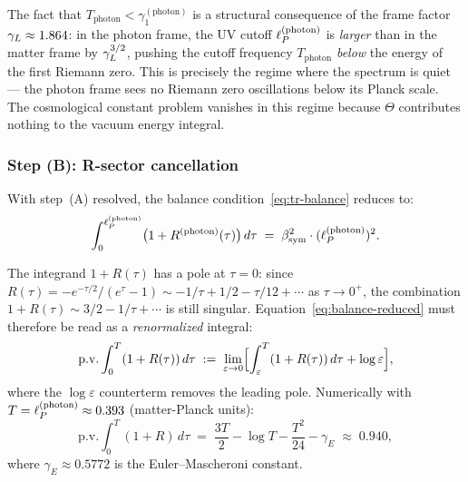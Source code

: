\begin{remark}
\label{rem:photon-frame-below-first-zero}
The fact that $T_{\mathrm{photon}} < \gamma_1^{(\mathrm{photon})}$
is a structural consequence of the frame factor $\gamma_L \approx 1.864$:
in the photon frame, the UV cutoff $\ell_P^{(\mathrm{photon})}$ is
\emph{larger} than in the matter frame by $\gamma_L^{3/2}$, pushing the
cutoff frequency $T_{\mathrm{photon}}$ \emph{below} the energy of
the first Riemann zero. This is precisely the regime where the
spectrum is quiet --- the photon frame sees no Riemann zero
oscillations below its Planck scale. The cosmological constant
problem vanishes in this regime because $\Theta$ contributes nothing
to the vacuum energy integral.
\end{remark}

\subsubsection*{Step (B): R-sector cancellation}

With step~(A) resolved, the balance condition~\eqref{eq:tr-balance}
reduces to:
\begin{equation}
\label{eq:balance-reduced}
  \int_0^{\ell_P^{(\mathrm{photon})}}
  \bigl(1 + R^{(\mathrm{photon})}(\tau)\bigr)\,d\tau
  \;=\; \beta_{\mathrm{sym}}^2\cdot(\ell_P^{(\mathrm{photon})})^2.
\end{equation}

\begin{remark}
\label{rem:regularization-B}
The integrand $1 + R(\tau)$ has a pole at $\tau=0$: since
$R(\tau) = -e^{-\tau/2}/(e^\tau-1) \sim -1/\tau + 1/2 - \tau/12 +
\cdots$ as $\tau\to 0^+$, the combination $1 + R(\tau) \sim
3/2 - 1/\tau + \cdots$ is still singular.
Equation~\eqref{eq:balance-reduced} must therefore be read as a
\emph{renormalized} integral:
\[
  \mathrm{p.v.}\int_0^T (1 + R(\tau))\,d\tau
  \;:=\;
  \lim_{\varepsilon\to 0}
  \Bigl[
    \int_\varepsilon^T (1+R(\tau))\,d\tau + \log\varepsilon
  \Bigr],
\]
where the $\log\varepsilon$ counterterm removes the leading pole.
Numerically with $T = \ell_P^{(\mathrm{photon})} \approx 0.393$
(matter-Planck units):
\[
  \mathrm{p.v.}\int_0^T (1+R)\,d\tau
  \;=\; \frac{3T}{2} - \log T - \frac{T^2}{24} - \gamma_E
  \;\approx\; 0.940,
\]
where $\gamma_E \approx 0.5772$ is the Euler--Mascheroni constant.
\end{remark}

